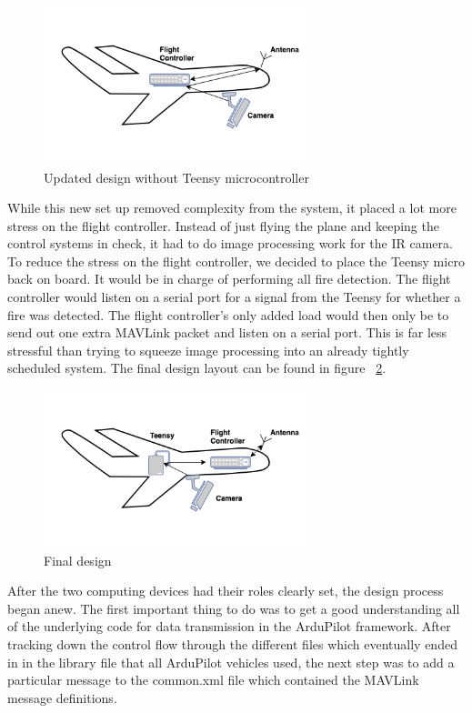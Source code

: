 \documentclass[12pt,journal,compsoc]{IEEEtran}
\begin{document}
\begin{figure}[h!]
\hspace*{0cm}
\centering
\includegraphics[width=3in]{Version2.png}
\caption{Updated design without Teensy microcontroller}
\label{version2}
\end{figure}

While this new set up removed complexity from the system, it placed a lot more stress on the flight controller. Instead of just flying the plane and keeping the control systems in check, it had to do image processing work for the IR camera. To reduce the stress on the flight controller, we decided to place the Teensy micro back on board. It would be in charge of performing all fire detection. The flight controller would listen on a serial port for a signal from the Teensy for whether a fire was detected. The flight controller's only added load would then only be to send out one extra MAVLink packet and listen on a serial port. This is far less stressful than trying to squeeze image processing into an already tightly scheduled system. The final design layout can be found in figure ~\ref{version3}.

\begin{figure}[h!]
\hspace*{0cm}
\centering
\includegraphics[width=3in]{Version3.png}
\caption{Final design}
\label{version3}
\end{figure}

After the two computing devices had their roles clearly set, the design process began anew. The first important thing to do was to get a good understanding all of the underlying code for data transmission in the ArduPilot framework. After tracking down the control flow through the different files which eventually ended in in the library file that all ArduPilot vehicles used, the next step was to add a particular message to the common.xml file which contained the MAVLink message definitions. 
\end{document}
